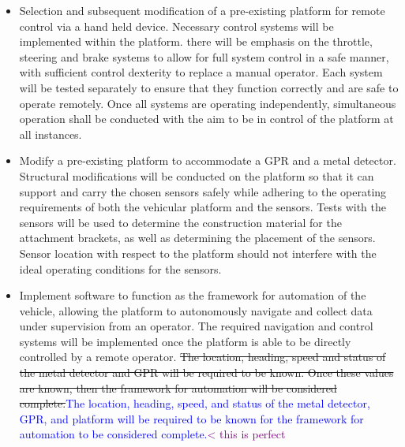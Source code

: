 \documentclass[main.tex]{subfiles}
\begin{document}
\begin{itemize}
\item Selection and subsequent modification of a pre-existing platform for remote control via a hand held device. Necessary control systems will be implemented within the platform. there will be emphasis on the throttle, steering and brake systems to allow for full system control in a safe manner, with sufficient control dexterity to replace a manual operator. Each system will be tested separately to ensure that they function correctly and are safe to operate remotely. Once all systems are operating independently, simultaneous operation shall be conducted with the aim to be in control of the platform at all instances. %

\item Modify a pre-existing platform to accommodate a GPR and a metal detector. Structural modifications will be conducted on the platform so that it can support and carry the chosen sensors safely while adhering to the operating requirements of both the vehicular platform and the sensors. %
Tests with the sensors will be used to determine the construction material for the attachment brackets, as well as determining the placement of the sensors. Sensor location with respect to the platform should not interfere with the ideal operating conditions for the sensors.

\item Implement software to function as the framework for automation of the vehicle, allowing the platform to autonomously navigate and collect data under supervision from an operator. 
The required navigation and control systems will be implemented once the platform is able to be directly controlled by a remote operator. \sout{The location, heading, speed and status of the metal detector and GPR will be required to be known. Once these values are known, then the framework for automation will be considered complete.}\textcolor{blue}{The location, heading, speed, and status of the metal detector, GPR, and platform will be required to be known for the framework for automation to be considered complete.}\textcolor{purple}{< this is perfect}


\end{itemize}
\end{document}
